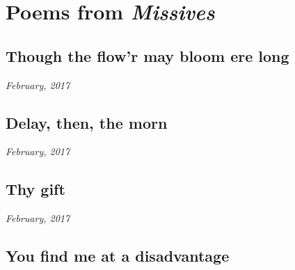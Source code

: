 \documentclass[11pt]{memoir}
\begin{document}
  \frontmatter

  

  \pagestyle{plain}

  \doublespacing

  \maketitle
  \thispagestyle{empty}

  \newpage

  

  \tableofcontents*
  \newpage
  
  \cleartoverso

  \onehalfspacing

    \mainmatter
    \pagestyle{fancyplain}

    \chapter{Poems from \textit{Missives}}
    \thispagestyle{empty}
    \newpage


    \section*{Though the flow'r may bloom ere long}

    \hfill\textit{February, 2017}

    
    \newpage


    \section*{Delay, then, the morn}

    \hfill\textit{February, 2017}

    
    \newpage


    \section*{Thy gift}

    \hfill\textit{February, 2017}

    
    \newpage


    \section*{You find me at a disadvantage}
\end{document}
